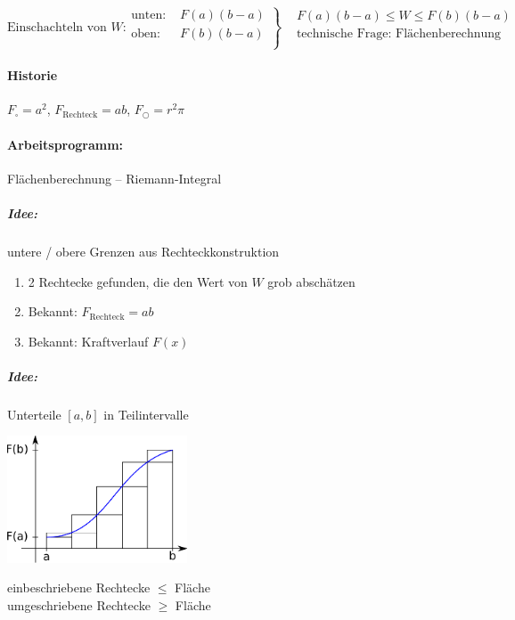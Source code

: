 \begin{equation*}
	\text{Einschachteln von $W$:}\left.
	\begin{aligned}
		\text{unten: } & F(a) (b - a) \\
		\text{oben: } & F(b) (b - a) \\
	\end{aligned}
	\right\}
	\begin{aligned}
		& F(a) (b - a) \leq W \leq F(b) (b - a) \\
		& \text{technische Frage: Flächenberechnung} \\
	\end{aligned}
\end{equation*}

\paragraph{Historie} $F_\square = a^2$, $F_{\text{Rechteck}} = ab$, $F_\bigcirc = r^2\pi$

\paragraph{Arbeitsprogramm:}Flächenberechnung -- Riemann-Integral

\subparagraph{Idee:}untere / obere Grenzen aus Rechteckkonstruktion

\begin{enumerate}
	\item 2 Rechtecke gefunden, die den Wert von $W$ grob abschätzen
	\item Bekannt: $F_{\text{Rechteck}} = ab$
	\item Bekannt: Kraftverlauf $F(x)$
\end{enumerate}

\subparagraph{Idee:}Unterteile $[a, b]$ in Teilintervalle
\begin{center}
	\includegraphics[width=0.4\textwidth]{include/20100126-3.pdf}
\end{center}
einbeschriebene Rechtecke $\leq$ Fläche \\
umgeschriebene Rechtecke $\geq$ Fläche \\
